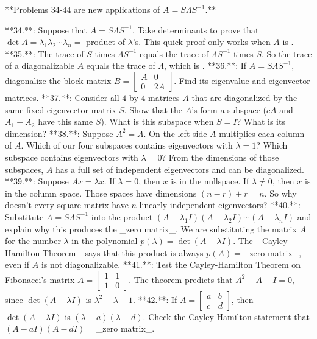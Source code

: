

**Problems 34-44 are new applications of \(A=S\Lambda S^{-1}\).**

**34.**: Suppose that \(A=S\Lambda S^{-1}\). Take determinants to prove that \(\det A=\lambda_{1}\lambda_{2}\cdots\lambda_{n}=\) product of \(\lambda\)'s. This quick proof only works when \(A\) is .
**35.**: The trace of \(S\) times \(\Lambda S^{-1}\) equals the trace of \(\Lambda S^{-1}\) times \(S\). So the trace of a diagonalizable \(A\) equals the trace of \(\Lambda\), which is .
**36.**: If \(A=S\Lambda S^{-1}\), diagonalize the block matrix \(B=\left[\begin{smallmatrix}A&0\\ 0&2A\end{smallmatrix}\right]\). Find its eigenvalue and eigenvector matrices.
**37.**: Consider all \(4\) by \(4\) matrices \(A\) that are diagonalized by the same fixed eigenvector matrix \(S\). Show that the \(A\)'s form a subspace (\(cA\) and \(A_{1}+A_{2}\) have this same \(S\)). What is this subspace when \(S=I\)? What is its dimension?
**38.**: Suppose \(A^{2}=A\). On the left side \(A\) multiplies each column of \(A\). Which of our four subspaces contains eigenvectors with \(\lambda=1\)? Which subspace contains eigenvectors with \(\lambda=0\)? From the dimensions of those subspaces, \(A\) has a full set of independent eigenvectors and can be diagonalized.
**39.**: Suppose \(Ax=\lambda x\). If \(\lambda=0\), then \(x\) is in the nullspace. If \(\lambda\neq 0\), then \(x\) is in the column space. Those spaces have dimensions \((n-r)+r=n\). So why doesn't every square matrix have \(n\) linearly independent eigenvectors?
**40.**: Substitute \(A=S\Lambda S^{-1}\) into the product \((A-\lambda_{1}I)(A-\lambda_{2}I)\cdots(A-\lambda_{n}I)\) and explain why this produces the _zero matrix_. We are substituting the matrix \(A\) for the number \(\lambda\) in the polynomial \(p(\lambda)=\det(A-\lambda I)\). The _Cayley-Hamilton Theorem_ says that this product is always \(p(A)=\)_zero matrix_, even if \(A\) is not diagonalizable.
**41.**: Test the Cayley-Hamilton Theorem on Fibonacci's matrix \(A=\left[\begin{smallmatrix}1&1\\ 1&0\end{smallmatrix}\right]\). The theorem predicts that \(A^{2}-A-I=0\), since \(\det(A-\lambda I)\) is \(\lambda^{2}-\lambda-1\).
**42.**: If \(A=\left[\begin{smallmatrix}a&b\\ c&d\end{smallmatrix}\right]\), then \(\det(A-\lambda I)\) is \((\lambda-a)(\lambda-d)\). Check the Cayley-Hamilton statement that \((A-aI)(A-dI)=\)_zero matrix_.

